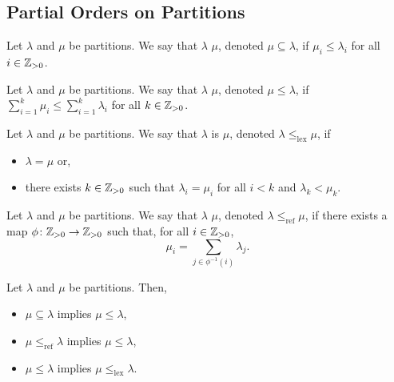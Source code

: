 \subsection{Partial Orders on Partitions}

\begin{definition}
    Let \(\lambda\) and \(\mu\) be partitions.
    We say that \(\lambda\)  \(\mu\), denoted \(\mu \subseteq \lambda\), if \(\mu_i \leq \lambda_i\) for all \(i \in \mathbb{Z}_{> 0}\). 
\end{definition}

\begin{definition}
    Let \(\lambda\) and \(\mu\) be partitions.
    We say that \(\lambda\)  \(\mu\), denoted \(\mu \leq \lambda\), if \(\sum_{i=1}^k \mu_i \leq \sum_{i=1}^k \lambda_i\) for all \(k \in \mathbb{Z}_{> 0}\).
\end{definition}

\newcommand\lexleq{\leq_{\mathrm{lex}}}

\begin{definition}
    Let \(\lambda\) and \(\mu\) be partitions.
    We say that \(\lambda\) is  \(\mu\), denoted \(\lambda \lexleq \mu\), if
    \begin{itemize}
        \item \(\lambda = \mu\) or,
        \item there exists \(k \in \mathbb{Z}_{> 0}\) such that \(\lambda_i = \mu_i\) for all \(i < k\) and \(\lambda_k < \mu_k\).
    \end{itemize}
\end{definition}

\newcommand\refines{\leq_{\mathrm{ref}}}
\newcommand\lessref{<_{\mathrm{ref}}}

\begin{definition}
    Let \(\lambda\) and \(\mu\) be partitions.
    We say that \(\lambda\)  \(\mu\),
    denoted \(\lambda \refines \mu\),
    if there exists a map \(\phi \colon \mathbb{Z}_{> 0} \to \mathbb{Z}_{> 0}\) such that, for all \(i \in \mathbb{Z}_{> 0}\),
    \[
        \mu_i = \sum_{j \in \phi^{-1}(i)} \lambda_j.
    \]
\end{definition}

\begin{proposition}
    Let \(\lambda\) and \(\mu\) be partitions.
    Then,
    \begin{itemize}
        \item \(\mu \subseteq \lambda\) implies \(\mu \leq \lambda\),
        \item \(\mu \refines \lambda\) implies \(\mu \leq \lambda\),
        \item \(\mu \leq \lambda\) implies \(\mu \lexleq \lambda\).
    \end{itemize}
\end{proposition}


